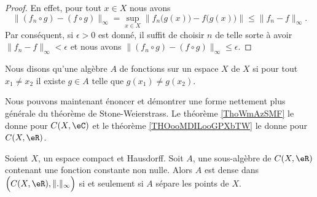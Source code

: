 \begin{proof}
	En effet, pour tout \( x\in X\) nous avons
	\begin{equation}
		\| (f_n\circ g)-(f\circ g) \|_{\infty}=\sup_{x\in X} \| f_n\big( g(x) \big)-f\big( g(x) \big) \|\leq \| f_n-f \|_{\infty}.
	\end{equation}
	Par conséquent, si \( \epsilon>0\) est donné, il suffit de choisir \( n\) de telle sorte à avoir \( \| f_n-f \|_{\infty}<\epsilon\) et nous avons \( \| (f_n\circ g)-(f\circ g) \|_{\infty}\leq \epsilon\).
\end{proof}

\begin{definition}
	Nous disons qu'une algèbre \( A\) de fonctions sur un espace \( X\)  de \( X\) si pour tout \( x_1\neq x_2\) il existe \( g\in A\) telle que \( g(x_1)\neq g(x_2)\).
\end{definition}

Nous pouvons maintenant énoncer et démontrer une forme nettement plus générale du théorème de Stone-Weierstrass. Le théorème \ref{ThoWmAzSMF} le donne pour \( C(X,\eC)\) et le théorème \ref{THOooMDILooGPXbTW} le donne pour \( C(X,\eR)\).

\begin{theorem} \label{THOooMDILooGPXbTW}
	Soient \( X\), un espace compact et Hausdorff. Soit \( A\), une sous-algèbre de \( C(X,\eR)\) contenant une fonction constante non nulle. Alors \( A\) est dense dans \( \Big( C(X,\eR),\| . \|_{\infty}\Big)\) si et seulement si \( A\) sépare les points de \(X\).
\end{theorem}

